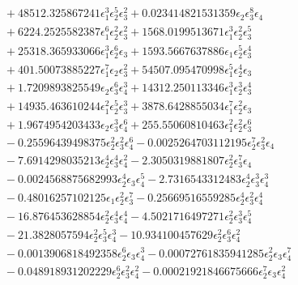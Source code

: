 \documentclass[10pt]{article}
\begin{document}
\begin{align*}
&{}  + 48512.325867241 \epsilon_{1}^{3} \epsilon_{2}^{5} \epsilon_{3}^{2} + 0.023414821531359 \epsilon_{2} \epsilon_{3}^{8} \epsilon_{4} \\
&{}  + 6224.2525582387 \epsilon_{1}^{6} \epsilon_{2}^{2} \epsilon_{3}^{2} + 1568.0199513671 \epsilon_{1}^{3} \epsilon_{2}^{2} \epsilon_{3}^{5} \\
&{}  + 25318.365933066 \epsilon_{1}^{3} \epsilon_{2}^{6} \epsilon_{3} + 1593.5667637886 \epsilon_{1} \epsilon_{2}^{5} \epsilon_{3}^{4} \\
&{}  + 401.50073885227 \epsilon_{1}^{7} \epsilon_{2} \epsilon_{3}^{2} + 54507.095470998 \epsilon_{1}^{5} \epsilon_{2}^{4} \epsilon_{3} \\
&{}  + 1.7209893825549 \epsilon_{2} \epsilon_{3}^{6} \epsilon_{4}^{3} + 14312.250113346 \epsilon_{1}^{3} \epsilon_{2}^{3} \epsilon_{3}^{4} \\
&{}  + 14935.463610244 \epsilon_{1}^{2} \epsilon_{2}^{5} \epsilon_{3}^{3} + 3878.6428855034 \epsilon_{1}^{7} \epsilon_{2}^{2} \epsilon_{3} \\
&{}  + 1.9674954203433 \epsilon_{2} \epsilon_{3}^{3} \epsilon_{4}^{6} + 255.55060810463 \epsilon_{1}^{2} \epsilon_{2}^{2} \epsilon_{3}^{6} \\
&{}  - 0.25596439498375 \epsilon_{2}^{2} \epsilon_{3}^{2} \epsilon_{4}^{6} - 0.0025264703112195 \epsilon_{2}^{7} \epsilon_{3}^{2} \epsilon_{4} \\
&{}  - 7.6914298035213 \epsilon_{2}^{4} \epsilon_{3}^{4} \epsilon_{4}^{2} - 2.3050319881807 \epsilon_{2}^{2} \epsilon_{3}^{7} \epsilon_{4} \\
&{}  - 0.0024568875682993 \epsilon_{2}^{4} \epsilon_{3} \epsilon_{4}^{5} - 2.7316543312483 \epsilon_{2}^{4} \epsilon_{3}^{3} \epsilon_{4}^{3} \\
&{}  - 0.48016257102125 \epsilon_{1} \epsilon_{2}^{2} \epsilon_{3}^{7} - 0.25669516559285 \epsilon_{2}^{4} \epsilon_{3}^{2} \epsilon_{4}^{4} \\
&{}  - 16.876453628854 \epsilon_{2}^{2} \epsilon_{3}^{4} \epsilon_{4}^{4} - 4.5021716497271 \epsilon_{2}^{2} \epsilon_{3}^{3} \epsilon_{4}^{5} \\
&{}  - 21.3828057594 \epsilon_{2}^{2} \epsilon_{3}^{5} \epsilon_{4}^{3} - 10.934100457629 \epsilon_{2}^{2} \epsilon_{3}^{6} \epsilon_{4}^{2} \\
&{}  - 0.0013906818492358 \epsilon_{2}^{6} \epsilon_{3} \epsilon_{4}^{3} - 0.00072761835941285 \epsilon_{2}^{2} \epsilon_{3} \epsilon_{4}^{7} \\
&{}  - 0.048918931202229 \epsilon_{2}^{6} \epsilon_{3}^{2} \epsilon_{4}^{2} - 0.00021921846675666 \epsilon_{2}^{7} \epsilon_{3} \epsilon_{4}^{2} \\

\end{align*}
\end{document}
